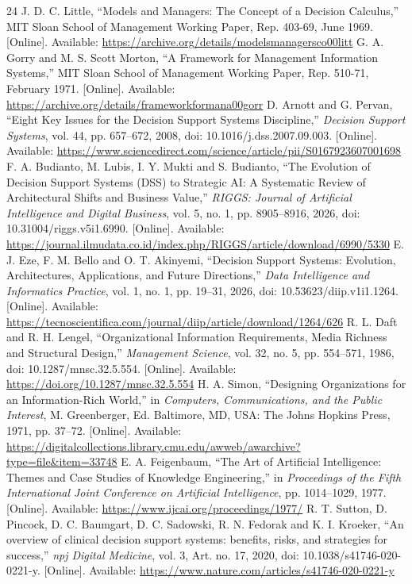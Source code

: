 \documentclass[journal]{IEEEtran}
\begin{document}
\begin{thebibliography}{24}
 J. D. C. Little, ``Models and Managers: The Concept of a Decision Calculus,'' MIT Sloan School of Management Working Paper, Rep. 403-69, June 1969. [Online]. Available: \url{https://archive.org/details/modelsmanagersco00litt}
 G. A. Gorry and M. S. Scott Morton, ``A Framework for Management Information Systems,'' MIT Sloan School of Management Working Paper, Rep. 510-71, February 1971. [Online]. Available: \url{https://archive.org/details/frameworkformana00gorr}
 D. Arnott and G. Pervan, ``Eight Key Issues for the Decision Support Systems Discipline,'' \emph{Decision Support Systems}, vol. 44, pp. 657--672, 2008, doi: 10.1016/j.dss.2007.09.003. [Online]. Available: \url{https://www.sciencedirect.com/science/article/pii/S0167923607001698}
 F. A. Budianto, M. Lubis, I. Y. Mukti and S. Budianto, ``The Evolution of Decision Support Systems (DSS) to Strategic AI: A Systematic Review of Architectural Shifts and Business Value,'' \emph{RIGGS: Journal of Artificial Intelligence and Digital Business}, vol. 5, no. 1, pp. 8905--8916, 2026, doi: 10.31004/riggs.v5i1.6990. [Online]. Available: \url{https://journal.ilmudata.co.id/index.php/RIGGS/article/download/6990/5330}
 E. J. Eze, F. M. Bello and O. T. Akinyemi, ``Decision Support Systems: Evolution, Architectures, Applications, and Future Directions,'' \emph{Data Intelligence and Informatics Practice}, vol. 1, no. 1, pp. 19--31, 2026, doi: 10.53623/diip.v1i1.1264. [Online]. Available: \url{https://tecnoscientifica.com/journal/diip/article/download/1264/626}
 R. L. Daft and R. H. Lengel, ``Organizational Information Requirements, Media Richness and Structural Design,'' \emph{Management Science}, vol. 32, no. 5, pp. 554--571, 1986, doi: 10.1287/mnsc.32.5.554. [Online]. Available: \url{https://doi.org/10.1287/mnsc.32.5.554}
 H. A. Simon, ``Designing Organizations for an Information-Rich World,'' in \emph{Computers, Communications, and the Public Interest}, M. Greenberger, Ed. Baltimore, MD, USA: The Johns Hopkins Press, 1971, pp. 37--72. [Online]. Available: \url{https://digitalcollections.library.cmu.edu/awweb/awarchive?type=file&item=33748}
 E. A. Feigenbaum, ``The Art of Artificial Intelligence: Themes and Case Studies of Knowledge Engineering,'' in \emph{Proceedings of the Fifth International Joint Conference on Artificial Intelligence}, pp. 1014--1029, 1977. [Online]. Available: \url{https://www.ijcai.org/proceedings/1977/}
 R. T. Sutton, D. Pincock, D. C. Baumgart, D. C. Sadowski, R. N. Fedorak and K. I. Kroeker, ``An overview of clinical decision support systems: benefits, risks, and strategies for success,'' \emph{npj Digital Medicine}, vol. 3, Art. no. 17, 2020, doi: 10.1038/s41746-020-0221-y. [Online]. Available: \url{https://www.nature.com/articles/s41746-020-0221-y}

\end{thebibliography}
\end{document}
